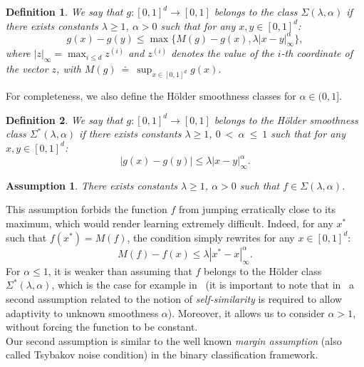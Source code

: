 \documentclass[final,12pt]{colt2018}
\newtheorem{asu}{Assumption}
\newtheorem{defi}{Definition}
\begin{document}
\begin{defi}\label{defC} We say that $g: [0,1]^d \rightarrow [0,1]$ belongs to the class $\Sigma(\lambda, \alpha)$ if there exists constants $\lambda\geq1$, $\alpha>0$ such that for any $x,y \in [0,1]^d$:
$$
g(x) - g(y) \leq \max\{M(g) - g(x), \lambda|x-y|_{\infty}^{\alpha}\},
$$
where $|z|_{\infty} = \max_{i \leq d}z^{(i)}$ and $z^{(i)}$ denotes the value of the $i$-th coordinate of the vector $z$, with $M(g)~\doteq~\sup_{x\in [0,1]^d}g(x)$.
\end{defi}

For completeness, we also define the Hölder smoothness classes for $\alpha \in (0,1]$. 

\begin{defi}\label{defH} We say that $g: [0,1]^d \rightarrow [0,1]$ belongs to the Hölder smoothness class $\Sigma^*(\lambda, \alpha)$ if there exists constants $\lambda \geq1$, $0~<~\alpha~\leq~1$ such that for any $x,y \in [0,1]^d$:
$$
|g(x) - g(y)| \leq \lambda|x-y|_{\infty}^{\alpha}.
$$
\end{defi}


\begin{asu}\label{asuC} There exists constants $\lambda \geq1$, $\alpha > 0$ such that $f \in \Sigma(\lambda, \alpha)$.
\end{asu}

This assumption forbids the function $f$ from jumping erratically close to its maximum, which would render learning extremely difficult. Indeed, for any $x^*$ such that $f(x^*) = M(f)$, the condition simply rewrites for any $x \in [0,1]^d$: $$M(f) - f(x) \leq \lambda|x^*-x|_{\infty}^{\alpha}.$$ For $\alpha \leq 1$, it is weaker than assuming that $f$ belongs to the Hölder class $\Sigma^*(\lambda,\alpha)$, which is the case for example in~\cite{kleinberg2004a,minsker2013estimation} (it is important to note that in~\cite{minsker2013estimation} a second assumption related to the notion of \emph{self-similarity} is required to allow adaptivity to unknown smoothness $\alpha$). Moreover, it allows us to consider $\alpha > 1$, without forcing the function to be constant.\\
Our second assumption is similar to the well known \textit{margin assumption} (also called Tsybakov noise condition) in the binary classification framework.
\end{document}
